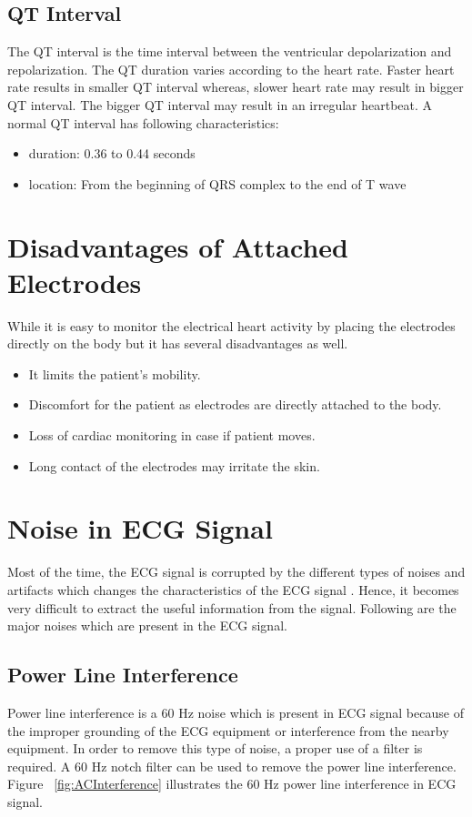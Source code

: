 \subsection{QT Interval}
The QT interval is the time interval between the ventricular depolarization and repolarization. The QT duration varies according to the heart rate. Faster heart rate results in smaller QT interval whereas, slower heart rate may result in bigger QT interval. The bigger QT interval may result in an irregular heartbeat. A normal QT interval has following characteristics:

\begin{itemize}
	\item duration: 0.36 to 0.44 seconds
	\item location: From the beginning of QRS complex to the end of T wave
\end{itemize}

\section{Disadvantages of Attached Electrodes} \label{electrodes_disadv}

While it is easy to monitor the electrical heart activity by placing the electrodes directly on the body but it has several disadvantages as well.

\begin{itemize}
	\item It limits the patient's mobility.
	\item Discomfort for the patient as electrodes are directly attached to the body.
	\item Loss of cardiac monitoring in case if patient moves.
	\item Long contact of the electrodes may irritate the skin.
\end{itemize}

\section{Noise in ECG Signal}
Most of the time, the ECG signal is corrupted by the different types of noises and artifacts which changes the characteristics of the ECG signal \cite{limaye2016ecg}. Hence, it becomes very difficult to extract the useful information from the signal. Following are the major noises which are present in the ECG signal.

\subsection{Power Line Interference}
Power line interference is a 60 Hz noise which is present in ECG signal because of the improper grounding of the ECG equipment or interference from the nearby equipment. In order to remove this type of noise, a proper use of a filter is required. A 60 Hz notch filter can be used to remove the power line interference. Figure ~\ref{fig:ACInterference} illustrates the 60 Hz power line interference in ECG signal.

